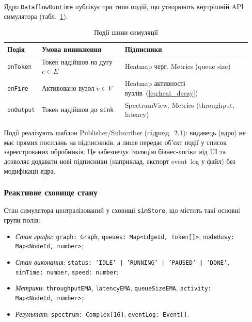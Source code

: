 Ядро \texttt{DataflowRuntime} публікує три типи подій, що утворюють
внутрішній API симулятора (табл.~\ref{tab:events}).

\begin{table}[H]
  \caption{Події шини симуляції}
  \label{tab:events}
  \centering
  \small
  \begin{tabular}{p{2.2cm}p{5.2cm}p{5.8cm}}
    \toprule
    Подія & Умова виникнення & Підписники \\
    \midrule
    \texttt{onToken}  & Токен надійшов на дугу $e \in E$ & Heatmap черг, Metrics (queue size) \\
    \texttt{onFire}   & Активовано вузол $v \in V$ & Heatmap активності вузлів~(\ref{eq:heat_decay}) \\
    \texttt{onOutput} & Токен надійшов до \texttt{sink} & SpectrumView, Metrics (throughput, latency) \\
    \bottomrule
  \end{tabular}
\end{table}

Події реалізують шаблон Publisher/Subscriber (підрозд.~2.1):
видавець (ядро) не має прямих посилань на підписників, а лише
передає об'єкт події у список зареєстрованих обробників. Це
забезпечує ізоляцію бізнес-логіки від UI та дозволяє додавати нові
підписники (наприклад, експорт event~log у файл) без модифікації
ядра.

\subsubsection*{Реактивне сховище стану}

Стан симулятора централізований у сховищі \texttt{simStore}, що
містить такі основні групи полів:

\begin{itemize}
  \item \textit{Стан графа}: \texttt{graph: Graph},
        \texttt{queues: Map<EdgeId, Token[]>},
        \texttt{nodeBusy: Map<NodeId, number>};
  \item \textit{Стан виконання}: \texttt{status: 'IDLE' | 'RUNNING' |
        'PAUSED' | 'DONE'}, \texttt{simTime: number},
        \texttt{speed: number};
  \item \textit{Метрики}: \texttt{throughputEMA},
        \texttt{latencyEMA}, \texttt{queueSizeEMA},
        \texttt{activity: Map<NodeId, number>};
  \item \textit{Результат}: \texttt{spectrum: Complex[16]},
        \texttt{eventLog: Event[]}.
\end{itemize}

